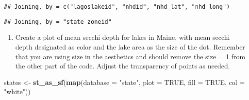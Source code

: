 \documentclass[]{article}
\newenvironment{Shaded}{\begin{snugshade}}{\end{snugshade}}
\newcommand{\CommentTok}[1]{\textcolor[rgb]{0.56,0.35,0.01}{\textit{#1}}}
\newcommand{\DataTypeTok}[1]{\textcolor[rgb]{0.13,0.29,0.53}{#1}}
\newcommand{\DecValTok}[1]{\textcolor[rgb]{0.00,0.00,0.81}{#1}}
\newcommand{\KeywordTok}[1]{\textcolor[rgb]{0.13,0.29,0.53}{\textbf{#1}}}
\newcommand{\NormalTok}[1]{#1}
\newcommand{\OperatorTok}[1]{\textcolor[rgb]{0.81,0.36,0.00}{\textbf{#1}}}
\newcommand{\OtherTok}[1]{\textcolor[rgb]{0.56,0.35,0.01}{#1}}
\newcommand{\StringTok}[1]{\textcolor[rgb]{0.31,0.60,0.02}{#1}}
\providecommand{\tightlist}{%
  \setlength{\itemsep}{0pt}\setlength{\parskip}{0pt}}
\begin{document}
\begin{verbatim}
## Joining, by = c("lagoslakeid", "nhdid", "nhd_lat", "nhd_long")
\end{verbatim}

\begin{verbatim}
## Joining, by = "state_zoneid"
\end{verbatim}

\begin{Shaded}
\end{Shaded}

\begin{enumerate}
\def\labelenumi{\arabic{enumi}.}
\setcounter{enumi}{5}
\tightlist
\item
  Create a plot of mean secchi depth for lakes in Maine, with mean
  secchi depth designated as color and the lake area as the size of the
  dot. Remember that you are using size in the aesthetics and should
  remove the size = 1 from the other part of the code. Adjust the
  transparency of points as needed.
\end{enumerate}

\begin{Shaded}
\begin{Highlighting}[]
\NormalTok{states <-}\StringTok{ }\KeywordTok{st_as_sf}\NormalTok{(}\KeywordTok{map}\NormalTok{(}\DataTypeTok{database =} \StringTok{"state"}\NormalTok{, }\DataTypeTok{plot =} \OtherTok{TRUE}\NormalTok{, }\DataTypeTok{fill =} \OtherTok{TRUE}\NormalTok{, }\DataTypeTok{col =} \StringTok{"white"}\NormalTok{))}
\end{Highlighting}
\end{Shaded}
\end{document}
